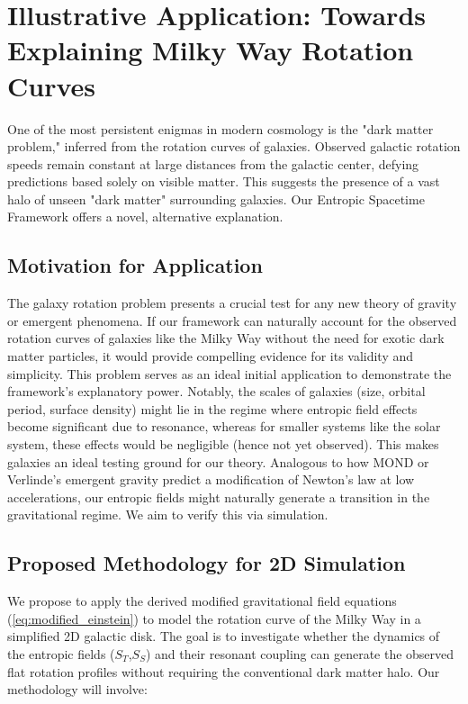 \documentclass[11pt,a4paper]{article} %
\newcommand{\ST}{S_T}
\newcommand{\SSp}{S_S} %
\begin{document}
\section{Illustrative Application: Towards Explaining Milky Way Rotation Curves}
One of the most persistent enigmas in modern cosmology is the "dark matter problem," inferred from the rotation curves of galaxies. Observed galactic rotation speeds remain constant at large distances from the galactic center, defying predictions based solely on visible matter. This suggests the presence of a vast halo of unseen "dark matter" surrounding galaxies. Our Entropic Spacetime Framework offers a novel, alternative explanation.

\subsection{Motivation for Application}
The galaxy rotation problem presents a crucial test for any new theory of gravity or emergent phenomena. If our framework can naturally account for the observed rotation curves of galaxies like the Milky Way without the need for exotic dark matter particles, it would provide compelling evidence for its validity and simplicity. This problem serves as an ideal initial application to demonstrate the framework's explanatory power. Notably, the scales of galaxies (size, orbital period, surface density) might lie in the regime where entropic field effects become significant due to resonance, whereas for smaller systems like the solar system, these effects would be negligible (hence not yet observed). This makes galaxies an ideal testing ground for our theory. Analogous to how MOND \cite{Milgrom1983} or Verlinde's emergent gravity \cite{Verlinde2011,Verlinde2017} predict a modification of Newton's law at low accelerations, our entropic fields might naturally generate a transition in the gravitational regime. We aim to verify this via simulation.

\subsection{Proposed Methodology for 2D Simulation}
We propose to apply the derived modified gravitational field equations (\cref{eq:modified_einstein}) to model the rotation curve of the Milky Way in a simplified 2D galactic disk. The goal is to investigate whether the dynamics of the entropic fields ($\ST$,$\SSp$) and their resonant coupling can generate the observed flat rotation profiles without requiring the conventional dark matter halo. Our methodology will involve:
\end{document}

